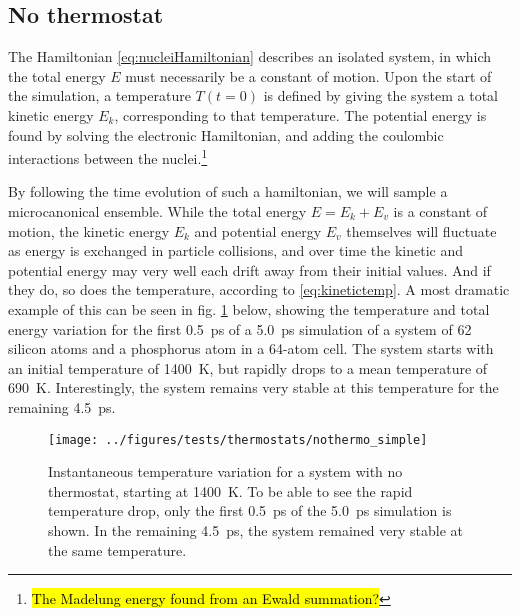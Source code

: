 \documentclass[11pt,bibliography=totoc,index=totoc]{scrbook}   %
\newcommand{\comment}[1]{\hl{#1}}
\begin{document}
%
\subsection{No thermostat}\label{sec:nothermo}
%

The Hamiltonian \eqref{eq:nucleiHamiltonian} describes an isolated system, in which the total energy $E$ must necessarily be a constant of motion.
Upon the start of the simulation, a temperature $T(t=0)$ is defined by giving the system a total kinetic energy $E_k$, corresponding to that temperature. The potential energy is found by solving the electronic Hamiltonian, and adding the coulombic interactions between the nuclei.\footnote{\comment{The Madelung energy found from an Ewald summation?}}

By following the time evolution of such a hamiltonian, we will sample a microcanonical ensemble. 
While the total energy $E=E_k+E_v$ is a constant of motion, the kinetic energy $E_k$ and potential energy $E_v$ themselves will fluctuate as energy is exchanged in particle collisions, and over time the kinetic and potential energy may very well each drift away from their initial values.
And if they do, so does the temperature, according to \eqref{eq:kinetictemp}. 
A most dramatic example of this can be seen in fig. \ref{fig:md_test_temperature_micro} below, showing the temperature and total energy variation for the first 0.5~ps of a 5.0~ps simulation of a system of 62 silicon atoms and a phosphorus atom in a 64-atom cell. 
The system starts with an initial temperature of 1400~K, but rapidly drops to a mean temperature of 690~K.
Interestingly, the system remains very stable at this temperature for the remaining 4.5~ps.

\begin{figure}[htbp]
  \centering
  \texttt{[image: ../figures/tests/thermostats/nothermo\_simple]}
  \caption{
    Instantaneous temperature variation for a system with no thermostat, starting at 1400~K.
    To be able to see the rapid temperature drop, only the first 0.5~ps of the 5.0~ps simulation is shown.
    In the remaining 4.5~ps, the system remained very stable at the same temperature.
  }
  \label{fig:md_test_temperature_micro}
\end{figure}
\end{document}
